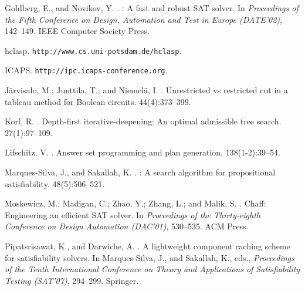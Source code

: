 \begin{thebibliography}{}
Goldberg, E., and Novikov, Y.
.
: A fast and robust {SAT} solver.
\newblock In {\em Proceedings of the Fifth Conference on Design, Automation and
  Test in Europe (DATE'02)},  142--149.
\newblock IEEE Computer Society Press.

\newblock hclasp. \texttt{http://www.cs.uni-potsdam.de/hclasp}.

\newblock ICAPS. \texttt{http://ipc.icaps-conference.org}.

J{\"a}rvisalo, M.; Junttila, T.; and Niemel{\"a}, I.
.
\newblock Unrestricted vs restricted cut in a tableau method for {B}oolean
  circuits.
  44(4):373--399.

Korf, R.
.
\newblock Depth-first iterative-deepening: An optimal admissible tree search.
 27(1):97--109.

Lifschitz, V.
.
\newblock Answer set programming and plan generation.
 138(1-2):39--54.

Marques-Silva, J., and Sakallah, K.
.
: A search algorithm for propositional satisfiability.
 48(5):506--521.

Moskewicz, M.; Madigan, C.; Zhao, Y.; Zhang, L.; and Malik, S.
.
\newblock Chaff: Engineering an efficient {SAT} solver.
\newblock In {\em Proceedings of the Thirty-eighth Conference on Design
  Automation (DAC'01)},  530--535.
\newblock ACM Press.

Pipatsrisawat, K., and Darwiche, A.
.
\newblock A lightweight component caching scheme for satisfiability solvers.
\newblock In Marques-Silva, J., and Sakallah, K., eds., {\em Proceedings of the
  Tenth International Conference on Theory and Applications of Satisfiability
  Testing (SAT'07)},
  294--299.
\newblock Springer.


\end{thebibliography}
